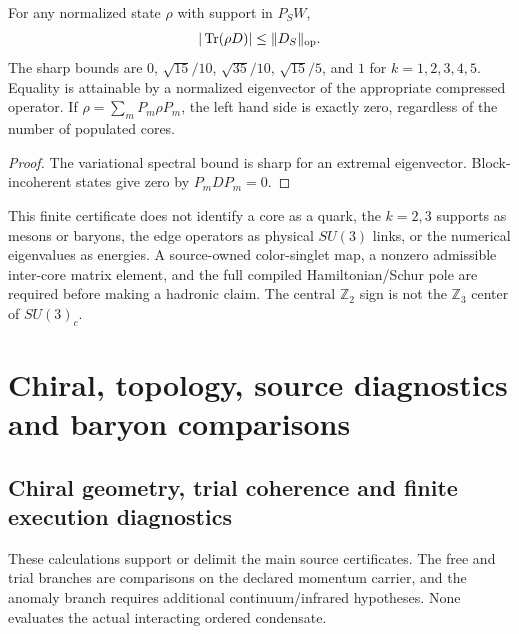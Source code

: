 \documentclass[12pt,a4paper]{article}
\begin{document}
\begin{corollary}
\label{p13:cor:v323-petersen-coherence-bound}
For any normalized state $\rho$ with support in $P_SW$,
\[
 |\operatorname{Tr}(\rho D)|\leq\|D_S\|_{\rm op}.
\]
The sharp bounds are $0$, $\sqrt{15}/10$,
$\sqrt{35}/10$, $\sqrt{15}/5$, and $1$ for $k=1,2,3,4,5$.
Equality is attainable by a normalized eigenvector of the appropriate
compressed operator.  If $\rho=\sum_mP_m\rho P_m$, the left hand
side is exactly zero, regardless of the number of populated cores.
\end{corollary}
\begin{proof}
The variational spectral bound is sharp for an extremal eigenvector.
Block-incoherent states give zero by $P_mDP_m=0$.
\end{proof}

\begin{remark}
This finite certificate does not identify a core as a quark, the
$k=2,3$ supports as mesons or baryons, the edge operators as physical
$SU(3)$ links, or the numerical eigenvalues as energies.  A source-owned
color-singlet map, a nonzero admissible inter-core matrix element, and
the full compiled Hamiltonian/Schur pole are required before making a
hadronic claim.  The central $\mathbb Z_2$ sign is not the
$\mathbb Z_3$ center of $SU(3)_c$.
\end{remark}


\section{Chiral, topology, source diagnostics and baryon comparisons}
\label{p13:sec:v237-d3}



\subsection{Chiral geometry, trial coherence and finite execution diagnostics}
\label{p10:app:chiral-diagnostics}
These calculations support or delimit the main source certificates.
The free and trial branches are comparisons on the declared momentum
carrier, and the anomaly branch requires additional continuum/infrared
hypotheses. None evaluates the actual interacting ordered condensate.
\end{document}
